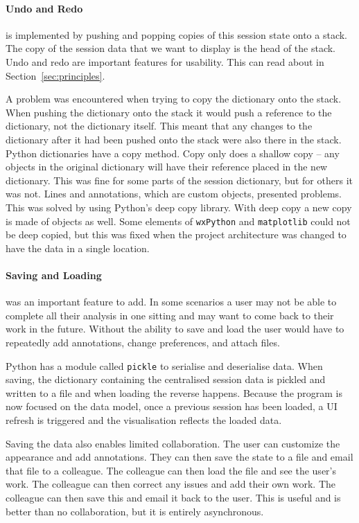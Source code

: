 \paragraph*{Undo and Redo} is implemented by pushing and popping copies of this session state onto a stack.  The copy of the session data that we want to display is the head of the stack.  Undo and redo are important features for usability.  This can read about in Section~\ref{sec:principles}.

A problem was encountered when trying to copy the dictionary onto the stack.  When pushing the dictionary onto the stack it would push a reference to the dictionary, not the dictionary itself. This meant that any changes to the dictionary after it had been pushed onto the stack were also there in the stack.  Python dictionaries have a copy method.  Copy only does a shallow copy -- any objects in the original dictionary will have their reference placed in the new dictionary.  This was fine for some parts of the session dictionary, but for others it was not. Lines and annotations, which are custom objects, presented problems.  This was solved by using Python's deep copy library.  With deep copy a new copy is made of objects as well.  Some elements of \texttt{wxPython} and \texttt{matplotlib} could not be deep copied, but this was fixed when the project architecture was changed to have the data in a single location.

\paragraph*{Saving and Loading} was an important feature to add.  In some scenarios a user may not be able to complete all their analysis in one sitting and may want to come back to their work in the future.  Without the ability to save and load the user would have to repeatedly add annotations, change preferences, and attach files.

Python has a module called \texttt{pickle} to serialise and deserialise data.  When saving, the dictionary containing the centralised session data is pickled and written to a file and when loading the reverse happens.  Because the program is now focused on the data model, once a previous session has been loaded, a \ac{UI} refresh is triggered and the visualisation reflects the loaded data.

Saving the data also enables limited collaboration.  The user can customize the appearance and add annotations.  They can then save the state to a file and email that file to a colleague.  The colleague can then load the file and see the user's work.  The colleague can then correct any issues and add their own work.  The colleague can then save this and email it back to the user.  This is useful and is better than no collaboration, but it is entirely asynchronous.

